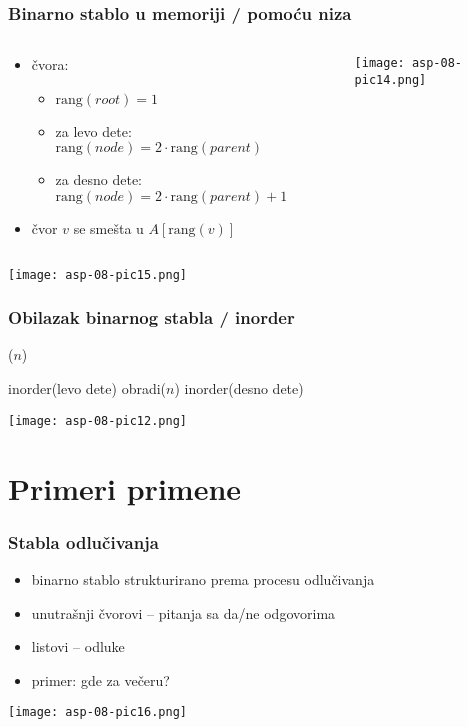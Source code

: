 \documentclass[compress]{beamer}
\begin{document}
\begin{frame}[fragile]
  \frametitle{Binarno stablo u memoriji / pomoću niza}
\begin{columns}
  \begin{column}[c]{7cm}
  \begin{itemize}
    \item {} čvora: 
    \begin{itemize}
      \item $\text{rang}(root) = 1$
      \item za levo dete: $\text{rang}(node) = 2\cdot \text{rang}(parent)$
      \item za desno dete: $\text{rang}(node) = 2\cdot \text{rang}(parent) + 1$
    \end{itemize}
    \item čvor $v$ se smešta u $A[\text{rang}(v)]$
  \end{itemize}
  \end{column}
  \begin{column}[c]{5cm}
  \begin{center}
    \texttt{[image: asp-08-pic14.png]}
  \end{center}
  \end{column}
\end{columns}
\begin{center}
  \texttt{[image: asp-08-pic15.png]}
\end{center}
\end{frame}

\begin{frame}[fragile]
  \frametitle{Obilazak binarnog stabla / inorder}
($n$)
\begin{algorithmic}
  \STATE inorder(levo dete)
\ENDIF
\STATE obradi($n$)
  \STATE inorder(desno dete)
\ENDIF
\end{algorithmic}
\begin{center}
  \texttt{[image: asp-08-pic12.png]}
\end{center}
\end{frame}

\section[Primeri]{Primeri primene}
\begin{frame}[fragile]
  \frametitle{Stabla odlučivanja}
  \begin{itemize}
    \item binarno stablo strukturirano prema procesu odlučivanja
    \item unutrašnji čvorovi -- pitanja sa da/ne odgovorima
    \item listovi -- odluke
    \item primer: gde za večeru?
  \end{itemize}
  \begin{center}
    \texttt{[image: asp-08-pic16.png]}
  \end{center}
\end{frame}
\end{document}

